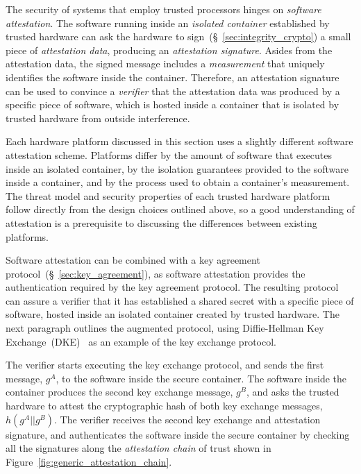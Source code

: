 \label{sec:generic_software_attestation}

The security of systems that employ trusted processors hinges on
\textit{software attestation}. The software running inside an \textit{isolated
container} established by trusted hardware can ask the hardware to
sign~(\S~\ref{sec:integrity_crypto}) a small piece of \textit{attestation
data}, producing an \textit{attestation signature}. Asides from the attestation
data, the signed message includes a \textit{measurement} that uniquely
identifies the software inside the container. Therefore, an attestation
signature can be used to convince a \textit{verifier} that the attestation data
was produced by a specific piece of software, which is hosted inside a
container that is isolated by trusted hardware from outside interference.

Each hardware platform discussed in this section uses a slightly different
software attestation scheme. Platforms differ by the amount of software that
executes inside an isolated container, by the isolation guarantees provided to
the software inside a container, and by the process used to obtain a
container's measurement. The threat model and security properties of each
trusted hardware platform follow directly from the design choices outlined
above, so a good understanding of attestation is a prerequisite to discussing
the differences between existing platforms.



Software attestation can be combined with a key agreement
protocol~(\S~\ref{sec:key_agreement}), as software attestation provides the
authentication required by the key agreement protocol. The resulting protocol can
assure a verifier that it has established a shared secret with a specific piece
of software, hosted inside an isolated container created by trusted hardware.
The next paragraph outlines the augmented protocol, using Diffie-Hellman Key
Exchange~(DKE)~\cite{diffie1976keyexchange} as an example of the key exchange
protocol.

The verifier starts executing the key exchange protocol, and sends the first
message, $g^{A}$, to the software inside the secure container. The software
inside the container produces the second key exchange message, $g^{B}$, and
asks the trusted hardware to attest the cryptographic hash of both key exchange
messages, $h(g^{A} || g^{B})$. The verifier receives the second key exchange
and attestation signature, and authenticates the software inside the secure
container by checking all the signatures along the \textit{attestation chain}
of trust shown in Figure~\ref{fig:generic_attestation_chain}.

